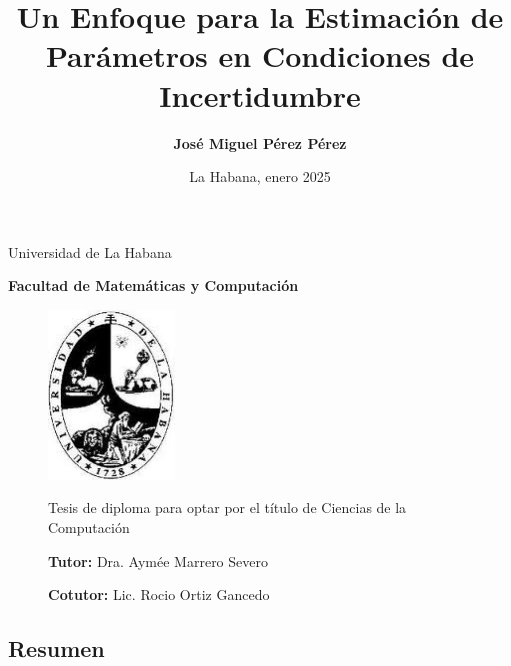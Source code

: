 \documentclass{article}
\begin{document}
\begin{center}
Universidad de La Habana

\textbf{Facultad de Matemáticas y Computación}
\end{center}

\begin{figure}[htbp]
    \centering
    \includegraphics[width=0.3\textwidth]{images/Universidad_De_La_Habana.jpg}
    
    \title{ \textbf{ Un Enfoque para la Estimación de Parámetros en Condiciones de Incertidumbre }}
    \begin{center}
        \large    Tesis de diploma para optar por el título de Ciencias de la Computación
    \end{center}    
    \author{ \textbf{ José Miguel Pérez Pérez }}
    \date{}
    \maketitle
    
    \begin{center}

    \textbf{Tutor:}
    \hspace{ 1pt } Dra. Aymée Marrero Severo 
    
    \textbf{Cotutor:}
    \hspace{ 1pt } Lic. Rocio Ortiz Gancedo
        
    \end{center}
    
\end{figure}

\begin{center}
\date{ La Habana, enero 2025}
\end{center}

\newpage 

\begin{center}
    \section*{ \textbf{ Resumen } }
\end{center}
\end{document}
